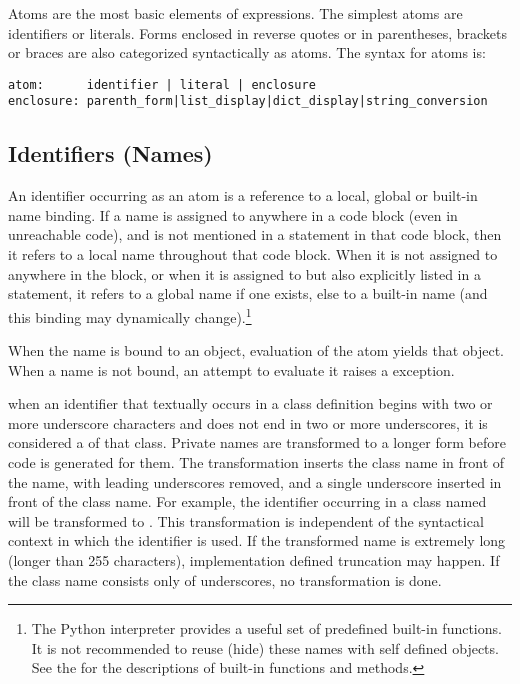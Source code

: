 Atoms are the most basic elements of expressions.  The simplest atoms
are identifiers or literals.  Forms enclosed in
reverse quotes or in parentheses, brackets or braces are also
categorized syntactically as atoms.  The syntax for atoms is:

\begin{verbatim}
atom:      identifier | literal | enclosure
enclosure: parenth_form|list_display|dict_display|string_conversion
\end{verbatim}

\subsection{Identifiers (Names)\label{atom-identifiers}}

An identifier occurring as an atom is a reference to a local, global
or built-in name binding.  If a name is assigned to anywhere in a code
block (even in unreachable code), and is not mentioned in a
 statement in that code block, then it refers to a local
name throughout that code block.  When it is not assigned to anywhere
in the block, or when it is assigned to but also explicitly listed in
a  statement, it refers to a global name if one exists,
else to a built-in name (and this binding may dynamically
change).\footnote{The Python interpreter provides a useful set of
  predefined built-in functions.  It is not recommended to reuse
  (hide) these names with self defined objects.  See the
   for
  the descriptions of built-in functions and methods.}

When the name is bound to an object, evaluation of the atom yields
that object.  When a name is not bound, an attempt to evaluate it
raises a  exception.

%
%
%
when an identifier that textually occurs in a class definition begins
with two or more underscore characters and does not end in two or more
underscores, it is considered a  of that class.
Private names are transformed to a longer form before code is
generated for them.  The transformation inserts the class name in
front of the name, with leading underscores removed, and a single
underscore inserted in front of the class name.  For example, the
identifier  occurring in a class named  will be
transformed to .  This transformation is independent
of the syntactical context in which the identifier is used.  If the
transformed name is extremely long (longer than 255 characters),
implementation defined truncation may happen.  If the class name
consists only of underscores, no transformation is done.

